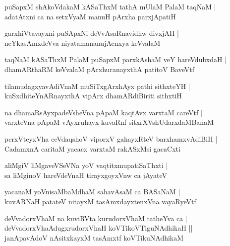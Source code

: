 \documentclass[twoside,12pt,openright]{book}
\newcounter{shloka}[chapter]
\begin{document}
\begin{shloka}
puSapxM shAkoVdakaM kASaThxM tathA mUlaM PalaM taqNaM |\\
adatAtxni ca na setxVyaM manuH pArxha parxjApatiH
\end{shloka}

\begin{shloka}
garxhiVtavayxni puSApxNi deVvAsaRnavidhw divxjAH |\\
neYkasAmxdeVva niyatamananujAcnxya keVvalaM
\end{shloka}

\begin{shloka}
taqNaM kASaThxM PalaM puSapxM parxkAshaM veY hareVdubxdaH |\\
dhamARthaRM keVvalaM pArxhuranayxthA patitoV BaveVtf 
\end{shloka}

\begin{shloka}
tilamudagxyavAdiVnaM muSiTxgArxhAyx pathi sithxteYH |\\
kuSxdhiteYnARnayxthA vipArx dhamARdiBiriti sithxtiH 
\end{shloka}

\begin{shloka}
na dhamaRsAyxpadeVsheVna pApaM kaqtAvx varxtaM careVtf |\\
varxteVna pApaM vAyxruhayx kuvaRnf sitxrXVshUdarxdaMBanaM 
\end{shloka}

\begin{shloka}
perxVteyxVha ceVdaqshoV viporxV gahayxRteV barxhamxvAdiBiH |\\
CadamxnA caritaM yacacx varxtaM rakASxMsi gacaCxti 
\end{shloka}

\begin{shloka}
aliMgiV liMgaveVSeVNa yoV vaqtitxmupatiSaThxti |\\
sa liMginoV hareVdeVnaH tirayxgoyxVnw ca jAyateV 
\end{shloka}

\begin{shloka}
yacanaM yoVnisaMbaMdhaM sahavAsaM ca BASaNaM |\\
kuvARNaH patateV nitayxM tasAmxdayxtenxVna vayaRyeVtf 
\end{shloka}

\begin{shloka}
deVvadorxVhaM na kuviRVta kurudorxVhaM tatheYva ca |\\
deVvadorxVhaAdugxrudorxVhaH koVTikoVTiguNAdhikaH ||\\
janApavAdoV nAsitxkayxM tasAmxtf koVTikuNAdhikaM 
\end{shloka}
\end{document}
